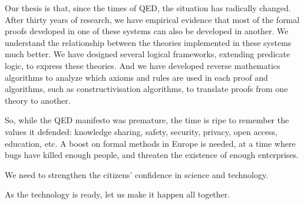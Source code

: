 Our thesis is that, since the times of QED, the situation has radically
changed. After thirty years of research, we have empirical evidence
that most of the formal proofs developed in one of these systems can
also be developed in another. We understand the relationship between
the theories implemented in these systems much better. We have
designed several logical frameworks, extending predicate logic, to express
these theories. And we have developed reverse
mathematics algorithms to analyze which axioms and rules are used in
each proof and algorithms, such as constructivisation algorithms, to
translate proofs from one theory to another.

So, while the QED manifesto was premature, the time is ripe to
remember the values it defended: knowledge sharing, safety, security,
privacy, open access, education, etc. A boost on formal methods in
Europe is needed, at a time where bugs have killed enough people, and
threaten the existence of enough enterprises.

We need to strengthen the citizens' confidence in science and technology.

As the technology is ready, let us make it happen all together.

